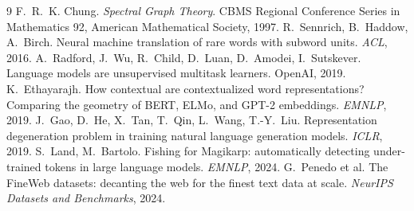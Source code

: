 \documentclass[11pt]{article}
\begin{document}
\begin{thebibliography}{9}\small
{} F.~R.~K. Chung. \emph{Spectral Graph Theory}. CBMS Regional
Conference Series in Mathematics 92, American Mathematical Society, 1997.
 R.~Sennrich, B.~Haddow, A.~Birch. Neural machine translation
of rare words with subword units. \emph{ACL}, 2016.
 A.~Radford, J.~Wu, R.~Child, D.~Luan, D.~Amodei,
I.~Sutskever. Language models are unsupervised multitask learners. OpenAI, 2019.
 K.~Ethayarajh. How contextual are contextualized word
representations? Comparing the geometry of BERT, ELMo, and GPT-2 embeddings.
\emph{EMNLP}, 2019.
 J.~Gao, D.~He, X.~Tan, T.~Qin, L.~Wang, T.-Y.~Liu. Representation
degeneration problem in training natural language generation models. \emph{ICLR},
2019.
 S.~Land, M.~Bartolo. Fishing for Magikarp: automatically detecting
under-trained tokens in large language models. \emph{EMNLP}, 2024.
 G.~Penedo et al. The FineWeb datasets: decanting the web for the
finest text data at scale. \emph{NeurIPS Datasets and Benchmarks}, 2024.
\end{thebibliography}
\end{document}
